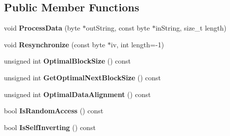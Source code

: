 \subsection*{Public Member Functions}
\begin{DoxyCompactItemize}
\item 
\hypertarget{class_c_f_b___cipher_template_adf14a759fd95fd687f4e257264771f89}{
void {\bfseries ProcessData} (byte $\ast$outString, const byte $\ast$inString, size\_\-t length)}
\label{class_c_f_b___cipher_template_adf14a759fd95fd687f4e257264771f89}

\item 
\hypertarget{class_c_f_b___cipher_template_a8604f13ab0f11d510c8e1f28526333a0}{
void {\bfseries Resynchronize} (const byte $\ast$iv, int length=-\/1)}
\label{class_c_f_b___cipher_template_a8604f13ab0f11d510c8e1f28526333a0}

\item 
\hypertarget{class_c_f_b___cipher_template_af4f1db86c6f13a1482c1d692029243bc}{
unsigned int {\bfseries OptimalBlockSize} () const }
\label{class_c_f_b___cipher_template_af4f1db86c6f13a1482c1d692029243bc}

\item 
\hypertarget{class_c_f_b___cipher_template_a05d8daeb591a7fde8f612c66e202c6f7}{
unsigned int {\bfseries GetOptimalNextBlockSize} () const }
\label{class_c_f_b___cipher_template_a05d8daeb591a7fde8f612c66e202c6f7}

\item 
\hypertarget{class_c_f_b___cipher_template_aadd4bd50f0c3bd1139d73e4cfe037f13}{
unsigned int {\bfseries OptimalDataAlignment} () const }
\label{class_c_f_b___cipher_template_aadd4bd50f0c3bd1139d73e4cfe037f13}

\item 
\hypertarget{class_c_f_b___cipher_template_a97d9128be26ce9ddf263cb7743a0fc1d}{
bool {\bfseries IsRandomAccess} () const }
\label{class_c_f_b___cipher_template_a97d9128be26ce9ddf263cb7743a0fc1d}

\item 
\hypertarget{class_c_f_b___cipher_template_ab121524251d83ece6e67b15b094806fa}{
bool {\bfseries IsSelfInverting} () const }
\label{class_c_f_b___cipher_template_ab121524251d83ece6e67b15b094806fa}

\end{DoxyCompactItemize}
